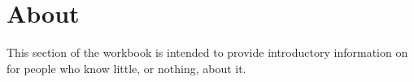 \section{About \ganga \label{introduction}}

\par
This section of the workbook is intended to provide introductory
information on \ganga for people who know little, or nothing,
about it.





